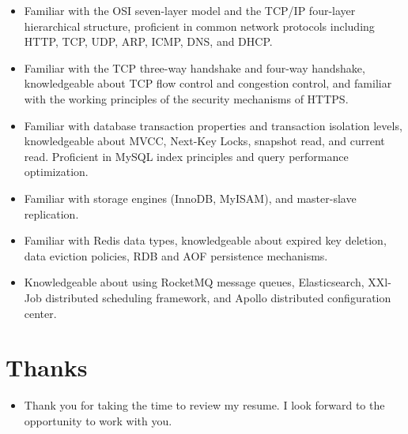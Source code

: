 \documentclass{resume}
\newcommand{\en}[1]{#1}
\newcommand{\zh}[1]{}
\begin{document}
\begin{itemize}[parsep=0.25ex]
      \item \en{Familiar with the OSI seven-layer model and the TCP/IP four-layer hierarchical structure, proficient in common network protocols including HTTP, TCP, UDP, ARP, ICMP, DNS, and DHCP.}
            \zh{熟悉OSI七层模型和TCP/IP四层体系分层结构，掌握常见的网络协议(HTTP、TCP、UDP、 ARP、ICMP、DNS、DHCP)}

       \item \en{Familiar with the TCP three-way handshake and four-way handshake, knowledgeable about TCP flow control and congestion control, and familiar with the working principles of the security mechanisms of HTTPS.}
            \zh{熟悉TCP三次握手和四次挥手，了解TCP流量控制和拥塞控制，了解Https的安全机制的工作原理}

       \item \en{Familiar with database transaction properties and transaction isolation levels, knowledgeable about MVCC, Next-Key Locks, snapshot read, and current read. Proficient in MySQL index principles and query performance optimization.}
            \zh{熟悉数据库事务特性、事务隔离级别，了解MVCC、Next-Key Locks、快照读与当前读}

       \item \en{Familiar with storage engines (InnoDB, MyISAM), and master-slave replication.}
            \zh{熟悉MySQL索引原理、查询性能优化，了解存储引擎(InnoDB、MyISAM)、主从复制}

       \item \en{Familiar with Redis data types, knowledgeable about expired key deletion, data eviction policies, RDB and AOF persistence mechanisms.}
            \zh{熟悉Redis数据类型，了解过期键删除、数据淘汰策略、RDB和AOF持久化机制}

       \item \en{Knowledgeable about using RocketMQ message queues, Elasticsearch, XXl-Job distributed scheduling framework, and Apollo distributed configuration center.}
            \zh{了解使用RocketMQ消息队列、Elasticsearch、XXl-Job分布式调度框架、Apollo分布式配置中心}

\end{itemize}

\section{\en{Thanks}\zh{致谢}}
\begin{itemize}
      \item \en{Thank you for taking the time to review my resume. I look forward to the opportunity to work with you.}
            \zh{感谢您花时间阅读我的简历，期待能有机会和您共事}
\end{itemize}
\end{document}
